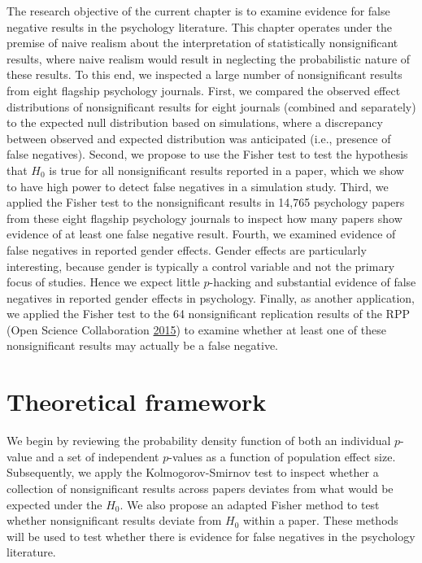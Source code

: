 \documentclass[a5paper]{book}
\begin{document}
The research objective of the current chapter is to examine evidence for
false negative results in the psychology literature. This chapter
operates under the premise of naive realism about the interpretation of
statistically nonsignificant results, where naive realism would result
in neglecting the probabilistic nature of these results. To this end, we
inspected a large number of nonsignificant results from eight flagship
psychology journals. First, we compared the observed effect
distributions of nonsignificant results for eight journals (combined and
separately) to the expected null distribution based on simulations,
where a discrepancy between observed and expected distribution was
anticipated (i.e., presence of false negatives). Second, we propose to
use the Fisher test to test the hypothesis that \(H_0\) is true for all
nonsignificant results reported in a paper, which we show to have high
power to detect false negatives in a simulation study. Third, we applied
the Fisher test to the nonsignificant results in 14,765 psychology
papers from these eight flagship psychology journals to inspect how many
papers show evidence of at least one false negative result. Fourth, we
examined evidence of false negatives in reported gender effects. Gender
effects are particularly interesting, because gender is typically a
control variable and not the primary focus of studies. Hence we expect
little \(p\)-hacking and substantial evidence of false negatives in
reported gender effects in psychology. Finally, as another application,
we applied the Fisher test to the 64 nonsignificant replication results
of the RPP (Open Science Collaboration
\protect\hyperlink{ref-doi:10.1126ux2fscience.aac4716}{2015}) to examine
whether at least one of these nonsignificant results may actually be a
false negative.

\section{Theoretical framework}\label{theoretical-framework}

We begin by reviewing the probability density function of both an
individual \(p\)-value and a set of independent \(p\)-values as a
function of population effect size. Subsequently, we apply the
Kolmogorov-Smirnov test to inspect whether a collection of
nonsignificant results across papers deviates from what would be
expected under the \(H_0\). We also propose an adapted Fisher method to
test whether nonsignificant results deviate from \(H_0\) within a paper.
These methods will be used to test whether there is evidence for false
negatives in the psychology literature.
\end{document}
